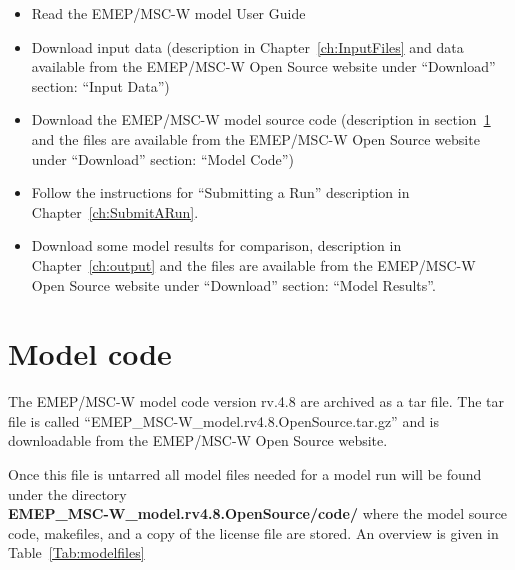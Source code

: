 \documentclass[a4paper,12pt]{report}
\begin{document}
\begin{itemize}
\item Read the EMEP/MSC-W model User Guide
\item
Download input data (description in Chapter~\ref{ch:InputFiles} and
data available from the EMEP/MSC-W Open Source website under ``Download''
section: ``Input Data'')
\item
Download the EMEP/MSC-W model source code (description in 
section~\ref{sec:ModelCode} and the files are available from the EMEP/MSC-W 
Open Source website under ``Download'' section: ``Model Code'')
\item
Follow the instructions for ``Submitting a Run'' description in
Chapter~\ref{ch:SubmitARun}.
\item
Download some model results for comparison, description in
Chapter~\ref{ch:output} and the files are available from the EMEP/MSC-W 
Open Source website under ``Download'' section: ``Model Results''. 


\end{itemize}

\section{Model code}
\label{sec:ModelCode}

The EMEP/MSC-W model code version rv.4.8 are archived as a tar file. 
The tar file is called ``EMEP\_MSC-W\_model.rv4.8.OpenSource.tar.gz'' and 
is downloadable from the EMEP/MSC-W Open Source website.

Once this file is untarred all model files needed for a model run will be 
found under the directory \\ {\bf EMEP\_MSC-W\_model.rv4.8.OpenSource/code/} 
where the model source code, makefiles, and a copy of the license file are 
stored. An overview is given in Table~\ref{Tab:modelfiles}
\end{document}
